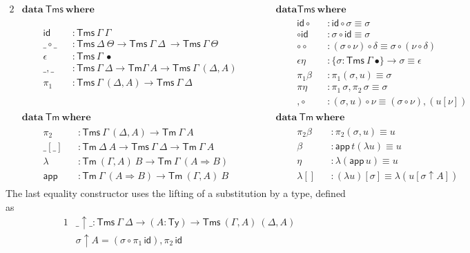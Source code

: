 \documentclass[a4paper,english,cleveref,autoref,draft]{lipics-v2019}
\newcommand{\agdaSymb}[1]{\mathsf{#1}}
\newcommand{\agdaKW}[1]{\mathbf{#1}}
\newcommand{\ind}{\hspace{1em}}
\newcommand{\data}{\agdaKW{data}}
\newcommand{\where}{\agdaKW{where}}
\newcommand{\Ty}{\agdaSymb{Ty}}
\newcommand{\Tms}{\agdaSymb{Tms}}
\newcommand{\Tm}{\agdaSymb{Tm}}
\newcommand{\id}{\agdaSymb{id}}
\newcommand{\app}{\agdaSymb{app}}
\newcommand{\lam}{\lambda}
\newcommand{\Ra}{\Rightarrow}
\begin{document}
\begin{alignat*}{2}
  & \data\ \Tms\ \where && \data \Tms\ \where \\
  & \ind
  \begin{alignedat}{2}
    & \id       && : \Tms\ \Gamma\ \Gamma \\
    & \_\circ\_ && : \Tms\ \Delta\ \Theta \to \Tms\ \Gamma\ \Delta\ \to \Tms\ \Gamma\ \Theta \\
    & \epsilon  && : \Tms\ \Gamma\ \bullet \\
    & \_,\_     && : \Tms\ \Gamma\ \Delta \to \Tm \Gamma\ A \to \Tms\ \Gamma\ (\Delta,A) \qquad \\
    & \pi_1     && : \Tms\ \Gamma\ (\Delta,A) \to \Tms\ \Gamma\ \Delta \\
    & && \\ & &&
  \end{alignedat}
  && \ind
  \begin{alignedat}{2}
    & \id\circ && : \id \circ \sigma \equiv \sigma \\
    & \circ\id && : \sigma \circ \id \equiv \sigma \\
    & \circ\circ && : (\sigma \circ \nu) \circ \delta \equiv \sigma \circ (\nu \circ \delta) \\
    & \epsilon\eta && : \{\sigma : \Tms\ \Gamma\ \bullet\} \to \sigma \equiv \epsilon \\
    & \pi_1\beta && : \pi_1(\sigma,u) \equiv \sigma \\
    & \pi\eta  && : \pi_1\,\sigma , \pi_2\,\sigma \equiv \sigma \\
    & ,\circ  && : (\sigma,u) \circ \nu \equiv (\sigma \circ \nu),(u[\nu])
  \end{alignedat} \\
  & \data\ \Tm\ \where && \data\ \Tm\ \where \\
  & \ind
  \begin{alignedat}{2}
    & \pi_2     && : \Tms\ \Gamma\ (\Delta,A) \to \Tm\ \Gamma\ A \\
    & \_[\_]    && : \Tm\ \Delta\ A \to \Tms\ \Gamma\ \Delta \to \Tm\ \Gamma\ A \\
    & \lam      && : \Tm\ (\Gamma,A)\ B \to \Tm\ \Gamma\ (A \Ra B) \\
    & \app      && : \Tm\ \Gamma\ (A \Ra B) \to \Tm\ (\Gamma,A)\ B
  \end{alignedat}
  && \ind
  \begin{alignedat}{2}
    & \pi_2\beta && : \pi_2(\sigma,u) \equiv u \\
    & \beta    && : \app\,t (\lam u) \equiv u \\
    & \eta     && : \lam (\app\, u) \equiv u \\
    & \lam[]   && : (\lam u)[\sigma] \equiv \lam(u[\sigma\uparrow A])
  \end{alignedat}
\end{alignat*}
The last equality constructor uses the lifting of a substitution by a type,
defined as
\begin{alignat*}{1}
  & \_\uparrow\_      : \Tms\ \Gamma\ \Delta \to (A:\Ty) \to \Tms\ (\Gamma,A)\ (\Delta,A) \\
  & \sigma \uparrow A = (\sigma \circ \pi_1\,\id) , \pi_2\,\id
\end{alignat*}
\end{document}
